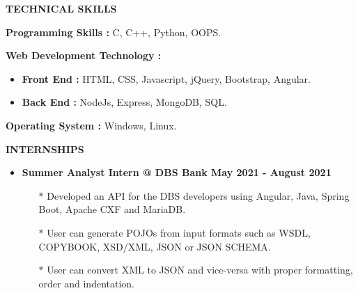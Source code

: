 \documentclass{article}
\begin{document}
{{{{\vspace{7mm}
\medskip
\large {{\bf  \color[rgb]{0,0,1} TECHNICAL SKILLS}} \hrulefill \par
\vspace{1.5mm}
\smallskip
\normalsize { {\bf Programming Skills :}  C, C++, Python, OOPS. } \par
\vspace{3mm}
\normalsize { {\bf Web Development Technology :}
\vspace{-2mm}
 \begin{itemize}
	\item {\bf Front End :} HTML, CSS, Javascript, jQuery, Bootstrap, Angular. 
	\vspace{-2mm}    
    \item {\bf Back End :} NodeJs, Express, MongoDB, SQL.
 \end{itemize} \par
\vspace{1mm}
\normalsize { {\bf Operating System :} Windows, Linux. } \par





\vspace{7mm}

{\medskip
\large { {\bf  \color[rgb]{0,0,1} INTERNSHIPS}} \hrulefill \par
\normalsize

\begin{itemize}
\item   {\bf Summer Analyst Intern @ DBS Bank {\hfill May 2021 - August 2021}}
\vspace{-2mm}
\begin{itemize}
  \vspace{0.5mm}
  \item[$\ast$] Developed an API for the DBS developers using Angular, Java, Spring Boot, Apache CXF and MariaDB. 
  \vspace{-0.5mm}
  \item[$\ast$] User can generate POJOs from input formats such as WSDL, COPYBOOK, XSD/XML, JSON or JSON SCHEMA.
  \item[$\ast$] User can convert XML to JSON and vice-versa with proper formatting, order and indentation.
\end{itemize}


\end{itemize}}}}}}}
\end{document}

